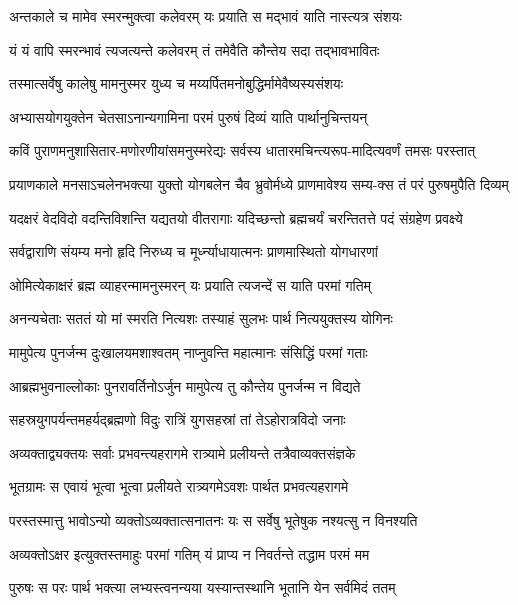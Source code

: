 \twolineshloka
{अन्तकाले च मामेव स्मरन्मुक्त्वा कलेवरम्}
{यः प्रयाति स मद्भावं याति नास्त्यत्र संशयः}


\twolineshloka
{यं यं वापि स्मरन्भावं त्यजत्यन्ते कलेवरम्}
{तं तमेवैति कौन्तेय सदा तद्भावभावितः}


\twolineshloka
{तस्मात्सर्वेषु कालेषु मामनुस्मर युध्य च}
{मय्यर्पितमनोबुद्धिर्मामेवैष्यस्यसंशयः}


\twolineshloka
{अभ्यासयोगयुक्तेन चेतसाऽनान्यगामिना}
{परमं पुरुषं दिव्यं याति पार्थानुचिन्तयन्}


\twolineshloka
{कविं पुराणमनुशासितार-मणोरणीयांसमनुस्मरेद्यः}
{सर्वस्य धातारमचिन्त्यरूप-मादित्यवर्णं तमसः परस्तात्}


\twolineshloka
{प्रयाणकाले मनसाऽचलेनभक्त्या युक्तो योगबलेन चैव}
{भ्रुवोर्मध्ये प्राणमावेश्य सम्य-क्स तं परं पुरुषमुपैति दिव्यम्}


\twolineshloka
{यदक्षरं वेदविदो वदन्तिविशन्ति यद्यतयो वीतरागाः}
{यदिच्छन्तो ब्रह्मचर्यं चरन्तितत्ते पदं संग्रहेण प्रवक्ष्ये}


\twolineshloka
{सर्वद्वाराणि संयम्य मनो हृदि निरुध्य च}
{मूर्ध्न्याधायात्मनः प्राणमास्थितो योगधारणां}


\twolineshloka
{ओमित्येकाक्षरं ब्रह्म व्याहरन्मामनुस्मरन्}
{यः प्रयाति त्यजन्दें स याति परमां गतिम्}


\twolineshloka
{अनन्यचेताः सततं यो मां स्मरति नित्यशः}
{तस्याहं सुलभः पार्थ नित्ययुक्तस्य योगिनः}


\twolineshloka
{मामुपेत्य पुनर्जन्म दुःखालयमशाश्वतम्}
{नाप्नुवन्ति महात्मानः संसिद्धिं परमां गताः}


\twolineshloka
{आब्रह्मभुवनाल्लोकाः पुनरावर्तिनोऽर्जुन}
{मामुपेत्य तु कौन्तेय पुनर्जन्म न विद्यते}


\twolineshloka
{सहस्रयुगपर्यन्तमहर्यद्ब्रह्मणो विदुः}
{रात्रिं युगसहस्रां तां तेऽहोरात्रविदो जनाः}


\twolineshloka
{अव्यक्ताद्व्यक्तयः सर्वाः प्रभवन्त्यहरागमे}
{रात्र्यामे प्रलीयन्ते तत्रैवाव्यक्तसंज्ञके}


\twolineshloka
{भूतग्रामः स एवायं भूत्वा भूत्वा प्रलीयते}
{रात्र्यगमेऽवशः पार्थत प्रभवत्यहरागमे}


\twolineshloka
{परस्तस्मात्तु भावोऽन्यो व्यक्तोऽव्यक्तात्सनातनः}
{यः स सर्वेषु भूतेषुक नश्यत्सु न विनश्यति}


\twolineshloka
{अव्यक्तोऽक्षर इत्युक्तस्तमाहुः परमां गतिम्}
{यं प्राप्य न निवर्तन्ते तद्धाम परमं मम}


\twolineshloka
{पुरुषः स परः पार्थ भक्त्या लभ्यस्त्वनन्यया}
{यस्यान्तस्थानि भूतानि येन सर्वमिदं ततम्}


